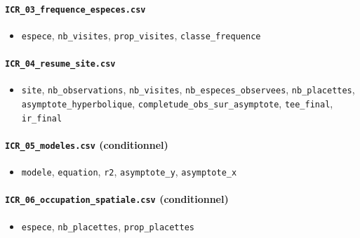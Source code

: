 \paragraph{\texorpdfstring{\texttt{ICR\_03\_frequence\_especes.csv}}{ICR\_03\_frequence\_especes.csv}}\label{icr_03_frequence_especes.csv}

\begin{itemize}
\tightlist
\item
  \texttt{espece}, \texttt{nb\_visites}, \texttt{prop\_visites},
  \texttt{classe\_frequence}
\end{itemize}

\paragraph{\texorpdfstring{\texttt{ICR\_04\_resume\_site.csv}}{ICR\_04\_resume\_site.csv}}\label{icr_04_resume_site.csv}

\begin{itemize}
\tightlist
\item
  \texttt{site}, \texttt{nb\_observations}, \texttt{nb\_visites},
  \texttt{nb\_especes\_observees}, \texttt{nb\_placettes},
  \texttt{asymptote\_hyperbolique},
  \texttt{completude\_obs\_sur\_asymptote}, \texttt{tee\_final},
  \texttt{ir\_final}
\end{itemize}

\paragraph{\texorpdfstring{\texttt{ICR\_05\_modeles.csv}
(conditionnel)}{ICR\_05\_modeles.csv (conditionnel)}}\label{icr_05_modeles.csv-conditionnel}

\begin{itemize}
\tightlist
\item
  \texttt{modele}, \texttt{equation}, \texttt{r2},
  \texttt{asymptote\_y}, \texttt{asymptote\_x}
\end{itemize}

\paragraph{\texorpdfstring{\texttt{ICR\_06\_occupation\_spatiale.csv}
(conditionnel)}{ICR\_06\_occupation\_spatiale.csv (conditionnel)}}\label{icr_06_occupation_spatiale.csv-conditionnel}

\begin{itemize}
\tightlist
\item
  \texttt{espece}, \texttt{nb\_placettes}, \texttt{prop\_placettes}
\end{itemize}

